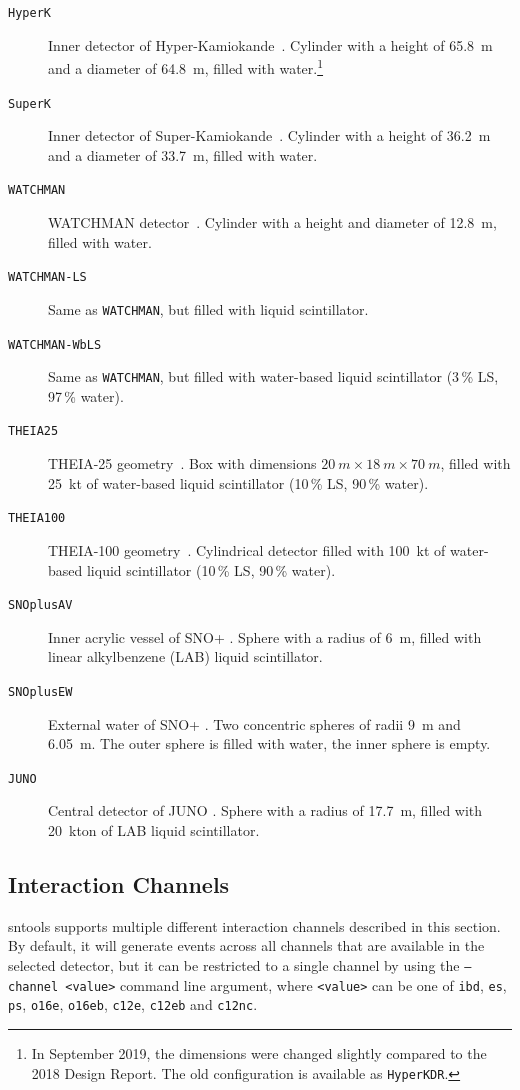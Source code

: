 \documentclass[11pt, oneside]{article}
\begin{document}
\begin{description}
\item[\texttt{HyperK}] Inner detector of Hyper-Kamiokande~\cite{HKDR2018}. Cylinder with a height of \SI{65.8}{m} and a diameter of \SI{64.8}{m}, filled with water.\footnote{In September 2019, the dimensions were changed slightly compared to the 2018 Design Report. The old configuration is available as \texttt{HyperKDR}.}
\item[\texttt{SuperK}] Inner detector of Super-Kamiokande~\cite{Fukuda2003}. Cylinder with a height of \SI{36.2}{m} and a diameter of \SI{33.7}{m}, filled with water.
\item[\texttt{WATCHMAN}] WATCHMAN detector~\cite{Askins2015}. Cylinder with a height and diameter of \SI{12.8}{m}, filled with water.
\item[\texttt{WATCHMAN-LS}] Same as \texttt{WATCHMAN}, but filled with liquid scintillator.
\item[\texttt{WATCHMAN-WbLS}] Same as \texttt{WATCHMAN}, but filled with water-based liquid scintillator (3\,\% LS, 97\,\% water).
\item[\texttt{THEIA25}] THEIA-25 geometry~\cite{Askins2020}. Box with dimensions $\SI{20}{m}\times\SI{18}{m}\times\SI{70}{m}$, filled with \SI{25}{kt} of water-based liquid scintillator (10\,\% LS, 90\,\% water).
\item[\texttt{THEIA100}] THEIA-100 geometry~\cite{Askins2020}. Cylindrical detector filled with \SI{100}{kt} of water-based liquid scintillator (10\,\% LS, 90\,\% water).
\item[\texttt{SNOplusAV}] Inner acrylic vessel of SNO+ \cite{albanese2021sno+}. Sphere with a radius of \SI{6}{m}, filled with linear alkylbenzene (LAB) liquid scintillator.
\item[\texttt{SNOplusEW}] External water of SNO+ \cite{albanese2021sno+}. Two concentric spheres of radii \SI{9}{m} and \SI{6.05}{m}. The outer sphere is filled with water, the inner sphere is empty.
\item[\texttt{JUNO}] Central detector of JUNO \cite{JUNO:2021vlw}. Sphere with a radius of \SI{17.7}{m}, filled with \SI{20}{kton} of LAB liquid scintillator.
\end{description}


\subsection{Interaction Channels} \label{sec:interaction-channels}
sntools supports multiple different interaction channels described in this section.
By default, it will generate events across all channels that are available in the selected detector, but it can be restricted to a single channel by using the \texttt{--channel <value>} command line argument, where \texttt{<value>} can be one of \texttt{ibd}, \texttt{es}, \texttt{ps}, \texttt{o16e}, \texttt{o16eb}, \texttt{c12e}, \texttt{c12eb} and \texttt{c12nc}.
\end{document}
